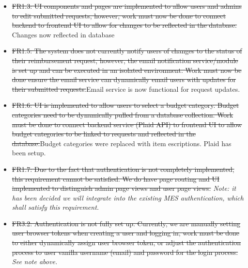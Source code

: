 \documentclass[12pt, titlepage]{article}
\begin{document}
\begin{itemize}
    \item \st{FR1.3: UI components and pages are implemented to allow users and admins to edit submitted requests, however, work must now be done to connect backend to frontend UI to allow for changes to be reflected in the database.} Changes now reflected in database
    \item \st{FR1.5: The system does not currently notify users of changes to the status of their reimbursement request, however, the email notification service/module is set up and can be executed in an isolated environment. Work must now be done ensure the email service can dynamically email users with updates for their submitted requests.}Email service is now functional for request updates.
    \item \st{FR1.6: UI is implemented to allow users to select a budget category. Budget categories need to be dynamically pulled from a database collection. Work must be done to connect backend service (Plaid API) to frontend UI to allow budget categories to be linked to requests and reflected in the database.}Budget categories were replaced with item escriptions. Plaid has been setup.
    \item \st{FR1.7: Due to the fact that authentication is not completely implemented, this requirement cannot be satisfied. We do have page routing and UI implemented to distinguish admin page views and user page views.} \textit{Note: it has been decided we will integrate into the existing MES authentication, which shall satisfy this requirement.}
    \item \st{FR3.2: Authentication is not fully set up. Currently, we are manually setting user browser tokens when creating a user and logging in, work must be done to either dynamically assign user browser token, or adjust the authentication process to user vanilla username (email) and password for the login process.} \textit{See note above.}
\end{itemize}
\end{document}

